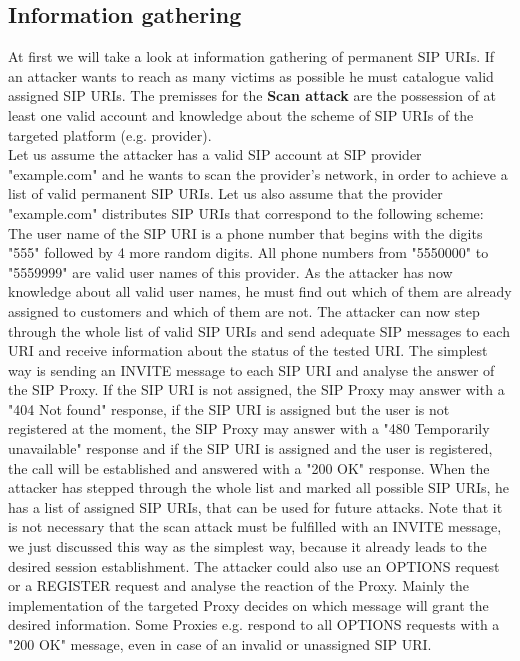 \documentclass[final
	]{issa}
\begin{document}
\subsection{Information gathering}
At first we will take a look at information gathering of permanent SIP URIs. If an attacker wants to reach as many victims as possible he must catalogue valid assigned SIP URIs. The premisses for the \textbf{Scan attack} are the possession of at least one valid account and knowledge about the scheme of SIP URIs of the targeted platform (e.g. provider).\\
Let us assume the attacker has a valid SIP account at SIP provider "example.com" and he wants to scan the provider's network, in order to achieve a list of valid permanent SIP URIs. Let us also assume that the provider "example.com" distributes SIP URIs that correspond to the following scheme: The user name of the SIP URI is a phone number that begins with the digits "555" followed by 4 more random digits. All phone numbers from "5550000" to "5559999" are valid user names of this provider. As the attacker has now knowledge about all valid user names, he must find out which of them are already assigned to customers and which of them are not. The attacker can now step through the whole list of valid SIP URIs and send adequate SIP messages to each URI and receive information about the status of the tested URI. The simplest way is sending an INVITE message to each SIP URI and analyse the answer of the SIP Proxy. If the SIP URI is not assigned, the SIP Proxy may answer with a "404 Not found" response, if the SIP URI is assigned but the user is not registered at the moment, the SIP Proxy may answer with a "480 Temporarily unavailable" response and if the SIP URI is assigned and the user is registered, the call will be established and answered with a "200 OK" response. When the attacker has stepped through the whole list and marked all possible SIP URIs, he has a list of assigned SIP URIs, that can be used for future attacks. Note that it is not necessary that the scan attack must be fulfilled with an INVITE message, we just discussed this way as the simplest way, because it already leads to the desired session establishment. The attacker could also use an OPTIONS request or a REGISTER request and analyse the reaction of the Proxy. Mainly the implementation of the targeted Proxy decides on which message will grant the desired information. Some Proxies e.g. respond to all OPTIONS requests with a "200 OK" message, even in case of an invalid or unassigned SIP URI.\\
\end{document}
